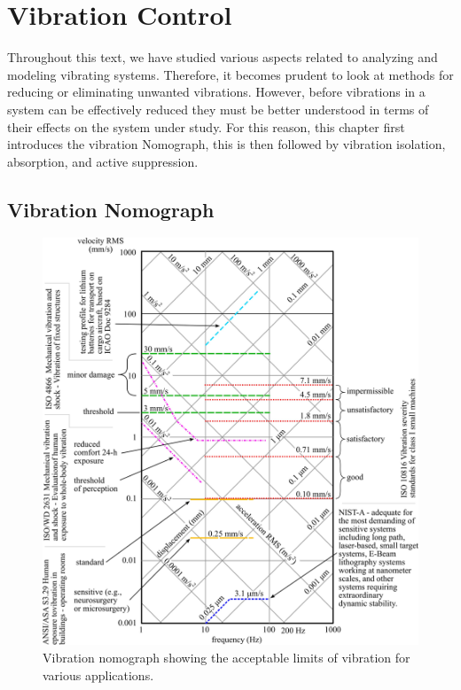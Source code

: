 \documentclass[12pt,letter]{article}
\numberwithin{ex}{section} %
\numberwithin{re}{section} %
\numberwithin{vcs}{section} %
\begin{document}
	
	\setcounter{section}{5}	
	\setcounter{figure}{0}   
	\renewcommand\thefigure{\thesection.\arabic{figure}}
	\setcounter{equation}{0}   
	\renewcommand\theequation{\thesection.\arabic{equation}}

	\section{Vibration Control}

Throughout this text, we have studied various aspects related to analyzing and modeling vibrating systems. Therefore, it becomes prudent to look at methods for reducing or eliminating unwanted vibrations. However, before vibrations in a system can be effectively reduced they must be better understood in terms of their effects on the system under study. For this reason, this chapter first introduces the vibration Nomograph, this is then followed by vibration isolation, absorption, and active suppression.  

\subsection{Vibration Nomograph}

\begin{figure}[tp!]
    \centering
    \includegraphics[width=6.5in]{../figures/Vibration_nomograph}
    \caption{Vibration nomograph showing the acceptable limits of vibration for various applications.}
    \label{fig:Vibration_nomograph}
\end{figure}
\end{document}
